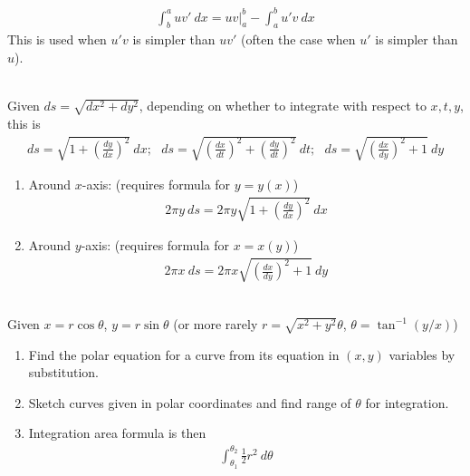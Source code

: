 \begin{remark} 
\begin{align}
\int_b^a uv' \ dx = uv\vert_a^b - \int_a^b u'v \ dx \nonumber
\end{align}
This is used when $u'v$ is simpler than $uv'$ (often the case when $u'$ is simpler than $u$).
\end{remark}

\begin{remark} \\
Given $ds = \sqrt{dx^2 + dy^2}$, depending on whether to integrate with respect to $x,t,y$, this is
\begin{align}
ds = \sqrt{1+ \left(\frac{dy}{dx}\right)^2} \ dx; \ \ \ ds = \sqrt{\left(\frac{dx}{dt}\right)^2 + \left(\frac{dy}{dt}\right)^2} \ dt; \ \ \ ds = \sqrt{\left(\frac{dx}{dy}\right)^2 + 1} \ dy \nonumber
\end{align}
\end{remark}

\begin{remark} 
\begin{enumerate}[label=\roman*.]
\setlength{\itemsep}{0pt}
\item Around $x$-axis: (requires formula for $y = y(x)$)
\begin{align}
2\pi y \ ds = 2 \pi y \sqrt{1+ \left(\frac{dy}{dx}\right)^2} \ dx \nonumber
\end{align}
\item Around $y$-axis: (requires formula for $x = x(y)$)
\begin{align}
2\pi x \ ds = 2 \pi x \sqrt{\left(\frac{dx}{dy}\right)^2 + 1} \ dy \nonumber
\end{align}
\end{enumerate}
\end{remark}

\begin{remark} \\
Given $x = r \cos \theta$, $y = r \sin \theta$ (or more rarely $r = \sqrt{x^2 + y^2} \theta$, $\theta = \tan^{-1}(y/x)$)
\begin{enumerate}[label=\roman*.]
\setlength{\itemsep}{0pt}
\item Find the polar equation for a curve from its equation in $(x,y)$ variables by substitution.
\item Sketch curves given in polar coordinates and find range of $\theta$ for integration.
\item Integration area formula is then
\begin{align}
\int_{\theta_1}^{\theta_2} \frac{1}{2} r^2 \ d \theta \nonumber
\end{align}
\end{enumerate}
\end{remark}

